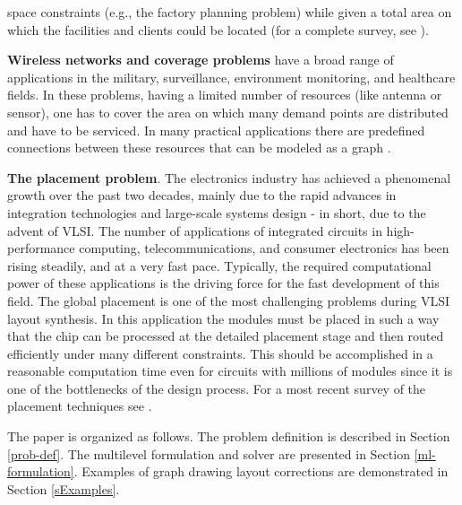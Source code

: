 \documentclass[final]{siamltex}
\begin{document}
space constraints (e.g., the factory planning problem) while given a total area on which the facilities and
clients could be located (for a complete survey, see \cite{dreznerfacility}).
\par {\bf Wireless networks and coverage problems} have a broad range of applications in the military,
surveillance, environment monitoring, and healthcare fields. In
these problems, having a limited number of resources (like antenna
or sensor), one has to cover the area on which many demand points
are distributed and have to be serviced. In many practical
applications there are predefined connections between these
resources that can be modeled as a graph
\cite{meguerdichian01coverage, cardei-energyefficient,
citeulike:717044}.
\par {\bf The placement problem}. The electronics industry has achieved a phenomenal growth over the past
two decades, mainly due to the rapid advances in integration technologies and large-scale systems design - in short,
due to the advent of VLSI. The number of applications of integrated circuits in high-performance computing,
telecommunications, and consumer electronics has been rising steadily, and at a very fast pace. Typically,
the required computational power of these applications is the driving force for the fast development of this field.
The global placement is one of the most challenging problems during VLSI layout synthesis. In this application
the modules must be placed in such a way that the chip can be processed at the detailed placement stage and
then routed efficiently under many different constraints. This should be accomplished in a reasonable computation
time even for circuits with millions of modules since it is one of the bottlenecks of the design process.
For a most recent survey of the placement techniques see \cite{vlsi2007book}.
\par The paper is organized as follows. The problem definition is described in Section \ref{prob-def}.
The multilevel formulation and solver are presented in Section
\ref{ml-formulation}. Examples of graph drawing layout corrections
are demonstrated in Section \ref{sExamples}.
\end{document}
